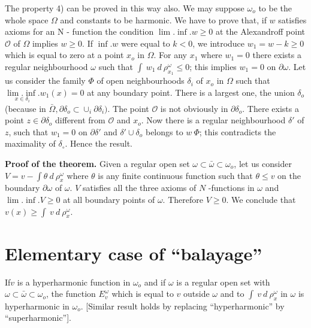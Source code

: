 \begin{remark*}%
  The property 4) can be proved in this way also. We may suppose
  $\omega_o$ to be the whole space $\Omega$ and constants to be
  harmonic. We have to prove that, if $w$ satisfies axioms for an N -
  function the condition $\lim.\inf. w \ge 0$ at the Alexandroff point
  $\mathscr{O}$ of $\Omega$ implies $w \ge 0$. If $\inf. w$ were equal
  to $k < 0$, we introduce $w_1 = w - k \ge 0$ which is equal to zero
  at a point $x_o$ in $\Omega$. For any $x_1$ where $w_1 = 0$ there
  exists a regular neighbourhood $\omega$ such that $\int ~ w_1 ~ d ~
  \rho^\omega_{x_1} \le 0$; this implies $w_1 = 0$ on $\partial
  \omega$. Let us consider the family $\Phi$ of open neighbourhoods
  $\delta_i$ of $x_o$ in $\Omega$ such that $\underset{x \in
    \delta_i}{\lim.\inf.} w_1(x) = 0$ at any boundary point. There is
  a largest one, the union $\delta_o$ (because in $\bar{\Omega},
  \partial \delta_o \subset \cup_i \partial \delta_i)$. The point
  $\mathscr{O}$ is not obviously in $\partial \delta_o$. There exists
  a point $z \in \partial \delta_o$ different from $\mathscr{O}$ and
  $x_o$. Now there is a regular neighbourhood $\delta'$ of $z$, such
  that $w_1 = 0$ on $\partial \delta'$ and $\delta' \cup \delta_o$
  belongs to $w ~ \Phi$; this contradicts the maximality of
  $\delta_\circ$. Hence the result. 
\end{remark*}

\noindent \textbf{Proof of the theorem.} 
  Given a regular open set $\omega \subset \bar{\omega} \subset
  \omega_o$, let us consider $V = v - \int \theta ~ d ~ \rho^\omega_x$
  where $\theta$ is any finite continuous function such that $\theta
  \le v$ on the boundary $\partial \omega$ of $\omega$. $V$ satisfies
  all the three axioms of $N$ -functions in $\omega$ and $\lim.\inf. V
  \ge 0$ at all boundary points of $\omega$. Therefore $V \ge 0$. We
  conclude that $v (x) \ge \int ~ v ~ d ~ \rho^\omega_x$. 

\section{Elementary case of ``balayage''}\label{p4:chap2:sec10}%

\begin{thm}\label{p4:chap2:sec10:thm:5} %
  If\pageoriginale $v$ is a hyperharmonic function in $\omega_o$ and if $\omega$ is
  a regular open set with $\omega \subset \bar{\omega} \subset
  \omega_o$, the function $E^\omega_v$ which is equal to $v$ outside
  $\omega$ and to $\int ~ v ~ d ~ \rho^\omega_x$ in $\omega$ is
  hyperharmonic in $\omega_o$. [Similar result holds by replacing
    ``hyperharmonic'' by ``superharmonic'']. 
\end{thm}

